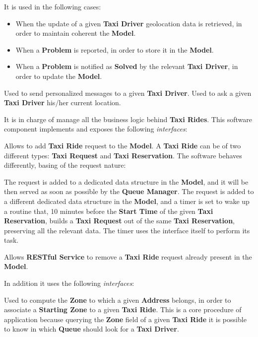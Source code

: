 \begin{itemize}
\begin{itemize}
\begin{itemize}
			It is used in the following cases:
			\begin{itemize}
				\item When the update of a given \textbf{Taxi Driver} geolocation data is retrieved, in order to maintain coherent the \textbf{Model}.
				\item When a \textbf{Problem} is reported, in order to store it in the \textbf{Model}.
				\item When a \textbf{Problem} is notified as \textbf{Solved} by the relevant \textbf{Taxi Driver}, in order to update the \textbf{Model}.
			\end{itemize}
			 Used to send personalized messages to a given \textbf{Taxi Driver}.
			 Used to ask a given \textbf{Taxi Driver} his/her current location.
		\end{itemize}
		 It is in charge of manage all the business logic behind \textbf{Taxi Rides}.
		This software component implements and exposes the following \textit{interfaces}:
		\begin{itemize}
			 Allows to add \textbf{Taxi Ride} request to the \textbf{Model}.
			A \textbf{Taxi Ride} can be of two different types: \textbf{Taxi Request} and \textbf{Taxi Reservation}.
			The software behaves differently, basing of the request nature:
			\begin{itemize}
				 The request is added to a dedicated data structure in the \textbf{Model}, and it will be then served as soon as possible by the \textbf{Queue Manager}.
				 The request is added to a different dedicated data structure in the \textbf{Model}, and a timer is set to wake up a routine that, 10 minutes before the \textbf{Start Time} of the given \textbf{Taxi Reservation}, builds a \textbf{Taxi Request} out of the same \textbf{Taxi Reservation}, preserving all the relevant data.
				The timer uses the interface itself to perform its task.
			\end{itemize}
			 Allows \textbf{RESTful Service} to remove a \textbf{Taxi Ride} request already present in the \textbf{Model}.
		\end{itemize}
		In addition it uses the following \textit{interfaces}:
		\begin{itemize}
			 Used to compute the \textbf{Zone} to which a given \textbf{Address} belongs, in order to associate a \textbf{Starting Zone} to a given \textbf{Taxi Ride}. This is a core procedure of \myTaxiService{} application because querying the \textbf{Zone} field of a given \textbf{Taxi Ride} it is possible to know in which \textbf{Queue} should look for a \textbf{Taxi Driver}.

\end{itemize}
\end{itemize}
\end{itemize}
